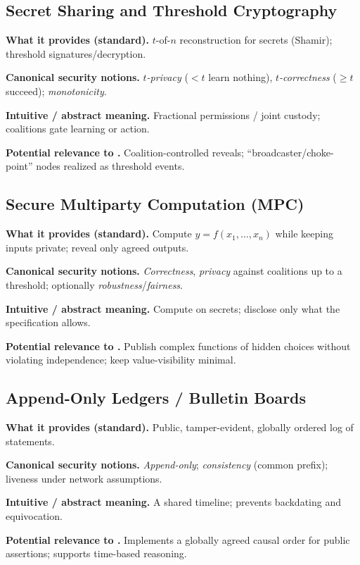 \subsection{Secret Sharing and Threshold Cryptography}
\textbf{What it provides (standard).}
$t$-of-$n$ reconstruction for secrets (Shamir); threshold signatures/decryption.

\textbf{Canonical security notions.}
\emph{$t$-privacy} ($< t$ learn nothing), \emph{$t$-correctness} ($\ge t$ succeed);
\emph{monotonicity}.

\textbf{Intuitive / abstract meaning.}
Fractional permissions / joint custody; coalitions gate learning or action.

\textbf{Potential relevance to \KFOL.}
Coalition-controlled reveals; “broadcaster/choke-point” nodes realized as threshold events.

\subsection{Secure Multiparty Computation (MPC)}
\textbf{What it provides (standard).}
Compute $y=f(x_1,\dots,x_n)$ while keeping inputs private; reveal only agreed outputs.

\textbf{Canonical security notions.}
\emph{Correctness}, \emph{privacy} against coalitions up to a threshold; optionally
\emph{robustness}/\emph{fairness}.

\textbf{Intuitive / abstract meaning.}
Compute on secrets; disclose only what the specification allows.

\textbf{Potential relevance to \KFOL.}
Publish complex functions of hidden choices without violating independence; keep value-visibility minimal.

\subsection{Append-Only Ledgers / Bulletin Boards}
\textbf{What it provides (standard).}
Public, tamper-evident, globally ordered log of statements.

\textbf{Canonical security notions.}
\emph{Append-only}; \emph{consistency} (common prefix); liveness under network assumptions.

\textbf{Intuitive / abstract meaning.}
A shared timeline; prevents backdating and equivocation.

\textbf{Potential relevance to \KFOL.}
Implements a globally agreed causal order for public assertions; supports time-based reasoning.

